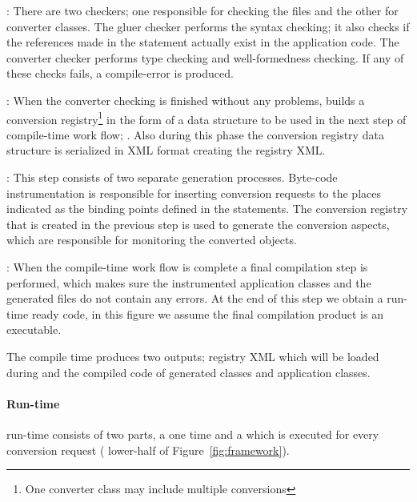 \begin{description}
\item{}: There are two checkers; one responsible for checking the \gluer files and the other for converter classes. The gluer checker performs the syntax checking; it also checks if the references made in the \gluer statement actually exist in the application code. The converter checker performs type checking and well-formedness checking. If any of these checks fails, a compile-error is produced. 
\item{}: When the converter checking is finished without any problems, \zamk builds a conversion registry\footnote{One converter class may include multiple conversions} in the form of a data structure to be used in the next step of compile-time work flow; . Also during this phase the conversion registry data structure is serialized in XML format creating the registry XML. 
\item{}: This step consists of two separate generation processes. Byte-code instrumentation is responsible for inserting \zamk conversion requests to the places indicated as the binding points defined in the \gluer statements. The conversion registry that is created in the previous step is used to generate the conversion aspects, which are responsible for monitoring the converted objects. 
\item{}: When the compile-time work flow is complete a final compilation step is performed, which makes sure the instrumented application classes and the generated files do not contain any errors. At the end of this step we obtain a \zamk run-time ready code, in this figure we assume the final compilation product is an executable.
\end{description}
 
The \zamk compile time produces two outputs; registry XML which will be loaded during  and the compiled code of \zamk generated classes and application classes. 


\paragraph{Run-time}

\zamk run-time consists of two parts, a one time  and a  which is executed for every conversion request (
lower-half of Figure~\ref{fig:framework}). 

